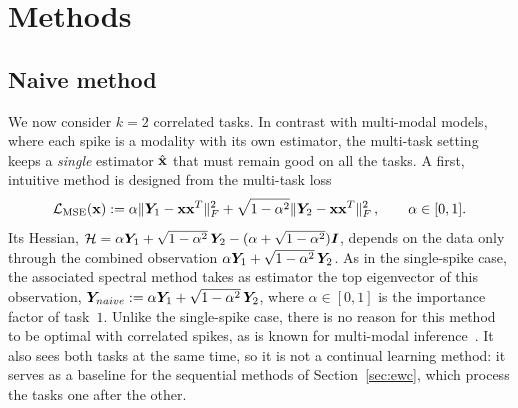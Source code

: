 \section{Methods}\label{sec:methods}
\subsection{Naive method}\label{sec:naive_def}
We now consider $k=2$ correlated tasks. In contrast with multi-modal models, where each spike is a modality with its own estimator, the multi-task setting keeps a \emph{single} estimator $\hat{\boldsymbol{\mathbf{x}}}$ that must remain good on all the tasks. A first, intuitive method is designed from the multi-task loss
\[
    \mathcal{L}_{\mathrm{MSE}}(\boldsymbol{\mathbf{x}}) := \alpha  \|\bm{Y}_1 - \boldsymbol{\mathbf{x}}\boldsymbol{\mathbf{x}}^T \|^2_F + \sqrt{1-\alpha^2}  \|\bm{Y}_2 - \boldsymbol{\mathbf{x}}\boldsymbol{\mathbf{x}}^T \|^2_F\,,\qquad \alpha \in [0,1].
\]
Its Hessian, $\mathcal{H} = \alpha \bm{Y}_1 + \sqrt{1-\alpha^2}\, \bm{Y}_2 - ( \alpha + \sqrt{1-\alpha^2})\bm{I}$, depends on the data only through the combined observation $\alpha \bm{Y}_1 + \sqrt{1-\alpha^2}\, \bm{Y}_2$. As in the single-spike case, the associated spectral method takes as estimator the top eigenvector of this observation, $\bm{Y}_{naive} := \alpha \bm{Y}_1 + \sqrt{1-\alpha^2}\, \bm{Y}_2$, where $\alpha \in [0,1]$ is the importance factor of task~$1$. Unlike the single-spike case, there is no reason for this method to be optimal with correlated spikes, as is known for multi-modal inference~\cite{Keup_2025, mergny2025spectralthresholdscorrelatedspiked, tabanelli2025computationalthresholdsmultimodallearning}. It also sees both tasks at the same time, so it is not a continual learning method: it serves as a baseline for the sequential methods of Section~\ref{sec:ewc}, which process the tasks one after the other.

